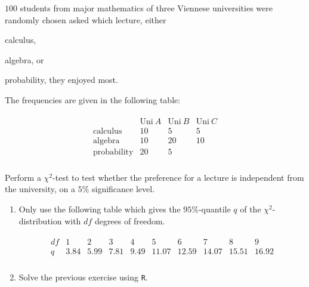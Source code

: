 
\begin{exercise}

$100$ students from major mathematics of three Viennese universities were randomly chosen  asked which lecture, either
\begin{enumerate*}[label = \alph*:]
    \item calculus,
    \item algebra, or
    \item probability, they enjoyed most.
\end{enumerate*}
The frequencies are given in the following table:

\begin{align*}
    \begin{array}{c|ccc}
                           & \text{Uni} ~ A & \text{Uni} ~ B & \text{Uni} ~ C \\ \hline
        \text{calculus}    & 10             & 5              &  5             \\
        \text{algebra}     & 10             & 20             &  10            \\
        \text{probability} & 20             & 5              &                \\
    \end{array}
\end{align*}

Perform a $\chi^2$-test to test whether the preference for a lecture is independent from the university, on a $5 \%$ significance level.

\begin{enumerate}[label = (\alph*)]

    \item Only use the following table which gives the $95 \%$-quantile $q$ of the $\chi^2$-distribution with $df$ degrees of freedom.
    
    \begin{align*}
        \begin{array}{c||ccccccccc}
            df & 1    & 2    & 3    & 4    & 5     & 6     & 7     & 8     & 9     \\ \hline
            q  & 3.84 & 5.99 & 7.81 & 9.49 & 11.07 & 12.59 & 14.07 & 15.51 & 16.92 \\
        \end{array}
    \end{align*}

    \item Solve the previous exercise using \texttt R.

\end{enumerate}

\end{exercise}


\begin{solution}

\phantom{}

\end{solution}

